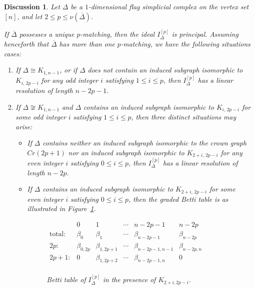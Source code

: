 \documentclass[12pt]{amsart}
\newtheorem{Discussion}[Theorem]{Discussion}
\begin{document}
\begin{Discussion}\label{Disc. summarize}
Let $\Delta$ be a $1$-dimensional flag simplicial complex on the vertex set $[n]$, and let $2 \leq p \leq \nu(\overline{\Delta})$. 

If $\overline{\Delta}$ possesses a unique $p$-matching, then the ideal $I_{\Delta}^{[p]}$ is principal. Assuming henceforth that $\overline{\Delta}$ has more than one $p$-matching, we have the following situations cases:

\begin{enumerate}
    \item  If $\Delta \cong K_{1,n-1}$, or if $\Delta$ does not contain an induced subgraph isomorphic to $K_{i,\,2p-i}$ for any odd integer $i$ satisfying $1 \le i \le p$, then $I_{\Delta}^{[p]}$ has a linear resolution of length $n-2p-1$.
    
    \item If $\Delta \not\cong K_{1,n-1}$ and $\Delta$ contains an induced subgraph isomorphic to $K_{i,\,2p-i}$ for some odd integer $i$ satisfying $1 \le i \le p$, then three distinct situations may arise:

\begin{itemize}
    \item[2a.] If $\Delta$ contains neither an induced subgraph isomorphic to the crown graph $Cr(2p+1)$ nor an induced subgraph isomorphic to $K_{2+i,\,2p-i}$ for any even integer $i$ satisfying $0 \leq i \leq p$, then $I_{\Delta}^{[p]}$ has a linear resolution of length $n-2p$.
    
    \item[2b.] If $\Delta$ contains an induced subgraph isomorphic to $K_{2+i,\,2p-i}$ for some even integer $i$ satisfying $0 \leq i \leq p$, then the graded Betti table is as illustrated in Figure~\ref{Fig:BettiShapes1}.
    
\begin{figure}[h]
\centering
$\begin{array}{r|cccccc}
      & 0 & 1 & \cdots & n-2p-1 & n-2p \\
\hline
\text{total:} & \beta_{0} & \beta_{1} & \cdots & \beta_{n-2p-1} & \beta_{n-2p} \\
\hline
2p:   & \beta_{0, 2p} & \beta_{1, 2p+1} & \cdots & \beta_{n-2p-1, n-1} & \beta_{n-2p, n} \\
2p+1: & 0 & \beta_{1, 2p+2} & \cdots & \beta_{n-2p-1, n} & 0 \\
\end{array}$
\caption{Betti table of $I_{\Delta}^{[p]}$ in the presence of $K_{2+i, 2p-i}$.}
\label{Fig:BettiShapes1}
\end{figure}


\end{itemize}
\end{enumerate}
\end{Discussion}
\end{document}
